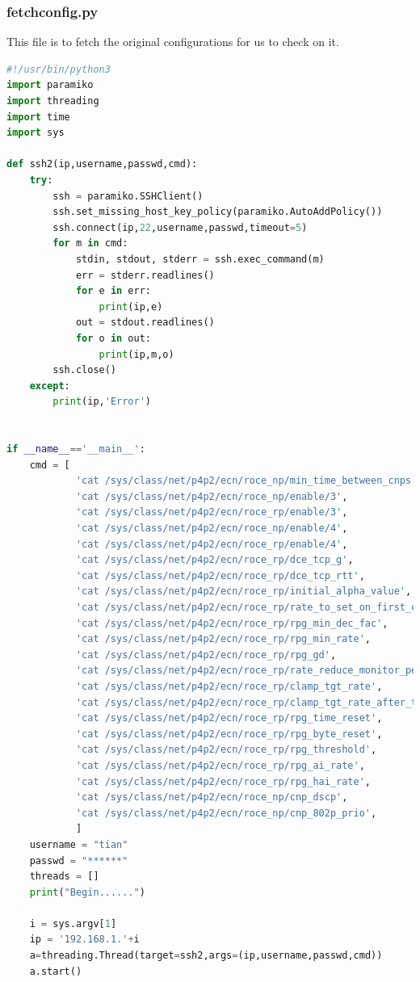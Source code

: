 \documentclass[12pt,a4paper]{article}
\begin{document}
\subsubsection*{fetchconfig.py}
This file is to fetch the original configurations for us to check on it.
\begin{lstlisting}[language=Python]
#!/usr/bin/python3
import paramiko
import threading
import time
import sys

def ssh2(ip,username,passwd,cmd):
    try:
        ssh = paramiko.SSHClient()
        ssh.set_missing_host_key_policy(paramiko.AutoAddPolicy())
        ssh.connect(ip,22,username,passwd,timeout=5)
        for m in cmd:
            stdin, stdout, stderr = ssh.exec_command(m)
            err = stderr.readlines()
            for e in err:
                print(ip,e)
            out = stdout.readlines()
            for o in out:
                print(ip,m,o)
        ssh.close()
    except:
        print(ip,'Error')


if __name__=='__main__':
    cmd = [
            'cat /sys/class/net/p4p2/ecn/roce_np/min_time_between_cnps',
            'cat /sys/class/net/p4p2/ecn/roce_np/enable/3',
            'cat /sys/class/net/p4p2/ecn/roce_rp/enable/3',
            'cat /sys/class/net/p4p2/ecn/roce_np/enable/4',
            'cat /sys/class/net/p4p2/ecn/roce_rp/enable/4',
            'cat /sys/class/net/p4p2/ecn/roce_rp/dce_tcp_g',
            'cat /sys/class/net/p4p2/ecn/roce_rp/dce_tcp_rtt',
            'cat /sys/class/net/p4p2/ecn/roce_rp/initial_alpha_value',
            'cat /sys/class/net/p4p2/ecn/roce_rp/rate_to_set_on_first_cnp',
            'cat /sys/class/net/p4p2/ecn/roce_rp/rpg_min_dec_fac',
            'cat /sys/class/net/p4p2/ecn/roce_rp/rpg_min_rate',
            'cat /sys/class/net/p4p2/ecn/roce_rp/rpg_gd',
            'cat /sys/class/net/p4p2/ecn/roce_rp/rate_reduce_monitor_period',
            'cat /sys/class/net/p4p2/ecn/roce_rp/clamp_tgt_rate',
            'cat /sys/class/net/p4p2/ecn/roce_rp/clamp_tgt_rate_after_time_inc',
            'cat /sys/class/net/p4p2/ecn/roce_rp/rpg_time_reset',
            'cat /sys/class/net/p4p2/ecn/roce_rp/rpg_byte_reset',
            'cat /sys/class/net/p4p2/ecn/roce_rp/rpg_threshold',
            'cat /sys/class/net/p4p2/ecn/roce_rp/rpg_ai_rate',
            'cat /sys/class/net/p4p2/ecn/roce_rp/rpg_hai_rate',
            'cat /sys/class/net/p4p2/ecn/roce_np/cnp_dscp',
            'cat /sys/class/net/p4p2/ecn/roce_np/cnp_802p_prio',
            ]
    username = "tian"
    passwd = "******"
    threads = []
    print("Begin......")

    i = sys.argv[1]
    ip = '192.168.1.'+i
    a=threading.Thread(target=ssh2,args=(ip,username,passwd,cmd))
    a.start()
\end{lstlisting}
\end{document}

